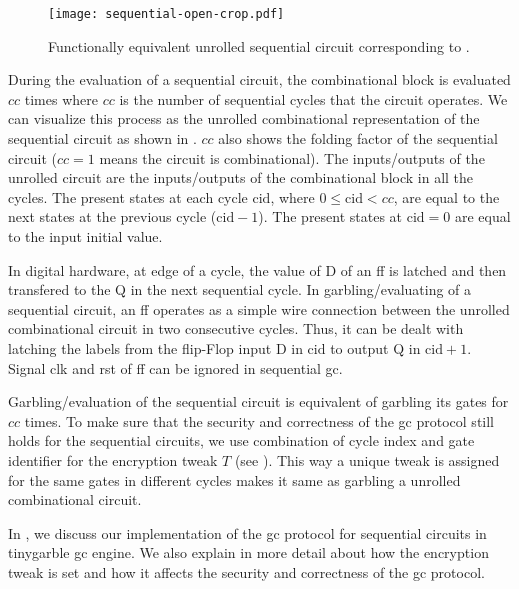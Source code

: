 \begin{figure}
  \centering
  \texttt{[image: sequential-open-crop.pdf]}
  \caption{Functionally equivalent unrolled sequential circuit corresponding to .}
  \label{fig:open-sequential}
\end{figure}

During the evaluation of a sequential circuit, the combinational block is evaluated $cc$ times where $cc$ is the number of sequential cycles that the circuit operates.
We can visualize this process as the unrolled combinational representation of the sequential circuit as shown in .
$cc$ also shows the folding factor of the sequential circuit ($cc=1$ means the circuit is combinational).
The inputs/outputs of the unrolled circuit are the inputs/outputs of the combinational block in all the cycles.
The present states at each cycle $\textrm{cid}$, where $0 \le \textrm{cid} < cc$, are equal to the next states at the previous cycle ($\textrm{cid}-1$).
The present states at $\textrm{cid}=0$ are equal to the input initial value.

In digital hardware, at edge of a cycle, the value of D of an \acrshort{ff} is latched and then transfered to the Q in the next sequential cycle.
In garbling/evaluating of a sequential circuit, an \acrshort{ff} operates as a simple wire connection between the unrolled combinational circuit in two consecutive cycles.
Thus, it can be dealt with latching the labels from the flip-Flop input D in $\textrm{cid}$ to output Q in $\textrm{cid}+1$.
Signal clk and rst of \acrshort{ff} can be ignored in sequential \acrshort{gc}.

Garbling/evaluation of the sequential circuit is equivalent of garbling its gates for $cc$ times.
To make sure that the security and correctness of the \acrshort{gc} protocol still holds for the sequential circuits, we use combination of cycle index and gate identifier for the encryption tweak $T$ (see ).
This way a unique tweak is assigned for the same gates in different cycles makes it same as garbling a unrolled combinational circuit.

In , we discuss our implementation of the \acrshort{gc} protocol for sequential circuits in \gls{tinygarble} \acrshort{gc} engine.
We also explain in more detail about how the encryption tweak is set and how it affects the security and correctness of the \acrshort{gc} protocol.

